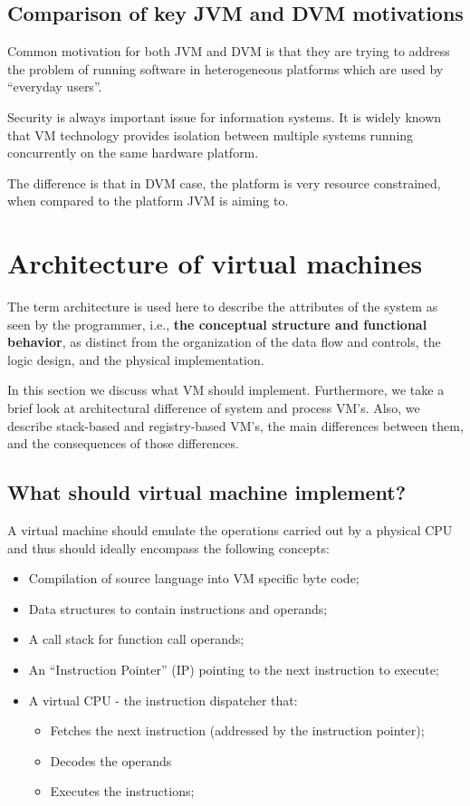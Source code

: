 \documentclass[11pt, oneside]{article}   	%
\begin{document}
\subsection{Comparison of key JVM and DVM motivations}

Common motivation for both JVM and DVM is that they are trying to address the problem of running software in heterogeneous platforms which are used by ``everyday users''.

Security is always important issue for information systems. It is widely known that VM technology provides isolation between multiple systems running concurrently on the same hardware platform\cite{smith2005architecture}.

The difference is that in DVM case, the platform is very resource constrained, when compared to the platform JVM is aiming to. 

\section{Architecture of virtual machines}

The term architecture is used here to describe the attributes of the system as seen by the programmer, i.e., \textbf{the conceptual structure and functional behavior}, as distinct from the organization of the data flow and controls, the logic design, and the physical implementation\cite{amdahl1964architecture}.

In this section we discuss what VM should implement. Furthermore, we take a brief look at architectural difference of system and process VM's. Also, we describe stack-based and registry-based VM's, the main differences between them, and the consequences of those differences.

\subsection{What should virtual machine implement?}

A virtual machine should emulate the operations carried out by a physical CPU and thus should ideally encompass the following concepts\cite{website:dalvikjit2010}:
\begin{itemize}
  \itemsep0pt
  \item Compilation of source language into VM specific byte code;
  \item Data structures to contain instructions and operands;
  \item A call stack for function call operands;
  \item An ``Instruction Pointer'' (IP) pointing to the next instruction to execute;
  \item A virtual CPU - the instruction dispatcher that:
  \begin{itemize}
    \item Fetches the next instruction (addressed by the instruction pointer);
    \item Decodes the operands
    \item Executes the instructions;
  \end{itemize}
\end{itemize}
\end{document}
